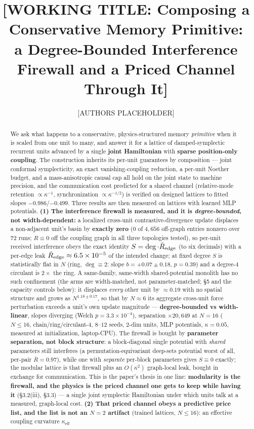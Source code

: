 \documentclass[11pt]{article}
\title{\textbf{[WORKING TITLE: Composing a Conservative Memory Primitive:\\ a Degree-Bounded Interference Firewall and a Priced Channel Through It]}}
\author{[AUTHORS PLACEHOLDER]}
\date{}
\newcommand{\keff}{\kappa_{\mathrm{eff}}}
\begin{document}
\sloppy
\maketitle

\begin{abstract}
We ask what happens to a conservative, physics-structured memory \emph{primitive} when it is scaled from one unit to many, and answer it for a lattice of damped-symplectic recurrent units advanced by a single \textbf{joint Hamiltonian} with \textbf{sparse position-only coupling}. The construction inherits its per-unit guarantees by composition --- joint conformal symplecticity, an exact vanishing-coupling reduction, a per-unit Noether budget, and a mass-anisotropic causal cap all hold on the joint state to machine precision, and the communication cost predicted for a shared channel (relative-mode retention $\propto\kappa^{-1}$, synchronization $\propto\kappa^{-1/2}$) is verified on designed lattices to fitted slopes $-0.986$/$-0.499$. Three results are then measured on lattices with learned MLP potentials. \textbf{(1) The interference firewall is measured, and it is \emph{degree-bounded}, not width-dependent:} a localized cross-unit contrastive-divergence update displaces a non-adjacent unit's basin by \textbf{exactly zero} ($0$ of $4{,}656$ off-graph entries nonzero over $72$ runs; $R\equiv0$ off the coupling graph in all three topologies tested), so per-unit received interference obeys the exact identity $S=\deg\cdot\bar R_{\rm edge}$ (to six decimals) with a per-edge leak $\bar R_{\rm edge}\approx6.5\times10^{-5}$ of the intended change; at fixed degree $S$ is statistically flat in $N$ (ring, $\deg\equiv2$: slope $b=+0.07\pm0.18$, $p=0.39$) and a degree-$4$ circulant is $2\times$ the ring. A same-family, same-width shared-potential monolith has no such confinement (the arms are width-matched, not parameter-matched; \S5 and the capacity controls below): it displaces \emph{every} other unit by $\approx0.19$ with no spatial structure and grows as $N^{1.18\pm0.17}$, so that by $N\approx6$ its aggregate cross-unit force perturbation exceeds a unit's own update magnitude --- \textbf{degree-bounded vs width-linear}, slopes diverging (Welch $p=3.3\times10^{-4}$), separation $\times20{,}649$ at $N=16$ ($N\le16$, chain/ring/circulant-$4$, $8$--$12$ seeds, $2$-dim units, MLP potentials, $\kappa=0.05$, measured at initialization, laptop-CPU). The firewall is bought by \textbf{parameter separation, not block structure}: a block-diagonal single potential with \emph{shared} parameters still interferes (a permutation-equivariant deep-sets potential worst of all, per-pair $\bar R=0.97$), while one with \emph{separate} per-block parameters gives $S\equiv0$ exactly; the modular lattice is that firewall plus an $O(\kappa^2)$ graph-local leak, bought in exchange for communication. This is the paper's thesis in one line: \textbf{modularity is the firewall, and the physics is the priced channel one gets to keep while having it} (\S3.2(iii), \S3.3) --- a single joint symplectic Hamiltonian under which units talk at a measured, graph-local cost. \textbf{(2) That priced channel obeys a predictive price list, and the list is not an $N=2$ artifact} (trained lattices, $N\le16$): an effective coupling curvature $\keff$ 
\end{abstract}
\end{document}
